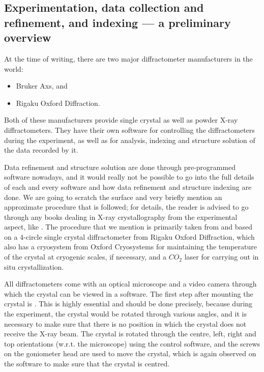 \subsection[Data collection and indexing (an overview)]{Experimentation, data collection and refinement, and indexing --- a preliminary overview}

At the time of writing, there are two major diffractometer manufacturers in the world:%
%	
	\begin{itemize}%
%	
	    \item Bruker Axs, and
	    
	    \item Rigaku Oxford Diffraction.
	    
	\end{itemize}
	
Both of these manufacturers provide single crystal as well as powder X-ray diffractometers. They have their own software for controlling the diffractometers during the experiment, as well as for analysis, indexing and structure solution of the data recorded by it.

Data refinement and structure solution are done through pre-programmed software nowadays, and it would really not be possible to go into the full details of each and every software and how data refinement and structure indexing are done. We are going to scratch the surface and very briefly mention an approximate procedure that is followed; for details, the reader is advised to go through any books dealing in X-ray crystallography from the experimental aspect, like \cite{Cullity2014}. The procedure that we mention is primarily taken from \cite{Chowdhury2022} and based on a 4-circle single crystal diffractometer from Rigaku Oxford Diffraction, which also has a cryosystem from Oxford Cryosystems for maintaining the temperature of the crystal at cryogenic scales, if necessary, and a $CO_2$ laser for carrying out in situ crystallization.

All diffractometers come with an optical microscope and a video camera through which the crystal can be viewed in a software. The first step after mounting the crystal is . This is highly essential and should be done precisely, because during the experiment, the crystal would be rotated through various angles, and it is necessary to make sure that there is no position in which the crystal does not receive the X-ray beam. The crystal is rotated through the centre, left, right and top orientations (w.r.t. the microscope) using the control software, and the screws on the goniometer head are used to move the crystal, which is again observed on the software to make sure that the crystal is centred.

